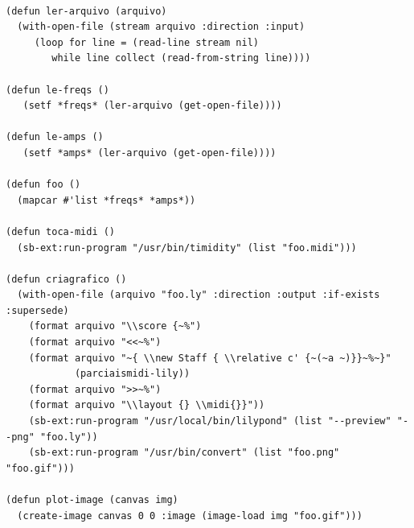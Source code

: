 \documentclass{ppgmus}
\begin{document}
\begin{verbatim}

(defun ler-arquivo (arquivo)
  (with-open-file (stream arquivo :direction :input)
     (loop for line = (read-line stream nil)
        while line collect (read-from-string line))))

(defun le-freqs ()
   (setf *freqs* (ler-arquivo (get-open-file))))

(defun le-amps ()
   (setf *amps* (ler-arquivo (get-open-file))))

(defun foo ()
  (mapcar #'list *freqs* *amps*))

(defun toca-midi ()
  (sb-ext:run-program "/usr/bin/timidity" (list "foo.midi")))

(defun criagrafico ()
  (with-open-file (arquivo "foo.ly" :direction :output :if-exists :supersede)
    (format arquivo "\\score {~%")
    (format arquivo "<<~%")
    (format arquivo "~{ \\new Staff { \\relative c' {~(~a ~)}}~%~}"
            (parciaismidi-lily))
    (format arquivo ">>~%")
    (format arquivo "\\layout {} \\midi{}}"))
    (sb-ext:run-program "/usr/local/bin/lilypond" (list "--preview" "--png" "foo.ly"))
    (sb-ext:run-program "/usr/bin/convert" (list "foo.png" "foo.gif")))

(defun plot-image (canvas img)
  (create-image canvas 0 0 :image (image-load img "foo.gif")))


\end{verbatim}
\end{document}
